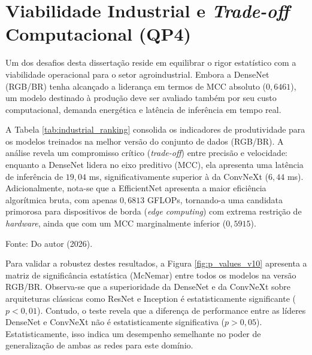 \section{Viabilidade Industrial e \textit{Trade-off} Computacional (QP4)}
\label{sec:viabilidade_industrial}

Um dos desafios desta dissertação reside em equilibrar o rigor estatístico com a viabilidade operacional para o setor agroindustrial. Embora a DenseNet (RGB/BR) tenha alcançado a liderança em termos de MCC absoluto ($0,6461$), um modelo destinado à produção deve ser avaliado também por seu custo computacional, demanda energética e latência de inferência em tempo real.

A Tabela \ref{tab:industrial_ranking} consolida os indicadores de produtividade para os modelos treinados na melhor versão do conjunto de dados (RGB/BR). A análise revela um compromisso crítico (\textit{trade-off}) entre precisão e velocidade: enquanto a DenseNet lidera no eixo preditivo (MCC), ela apresenta uma latência de inferência de $19,04$ ms, significativamente superior à da ConvNeXt ($6,44$ ms). Adicionalmente, nota-se que a EfficientNet apresenta a maior eficiência algorítmica bruta, com apenas $0,6813$ GFLOPs, tornando-a uma candidata primorosa para dispositivos de borda (\textit{edge computing}) com extrema restrição de \textit{hardware}, ainda que com um MCC marginalmente inferior ($0,5915$).

\begin{table}[!h]
    \centering
    \begin{threeparttable}
    \caption{Ranking de Eficiência Industrial (Conjunto de Dados RGB/BR).}
    \label{tab:industrial_ranking}
    
    \begin{tablenotes}
            \small 
            \item[] Fonte: Do autor (2026).
        \end{tablenotes}
        \end{threeparttable}
\end{table}

Para validar a robustez destes resultados, a Figura \ref{fig:p_values_v10} apresenta a matriz de significância estatística (McNemar) entre todos os modelos na versão RGB/BR. Observa-se que a superioridade da DenseNet e da ConvNeXt sobre arquiteturas clássicas como ResNet e Inception é estatisticamente significante ($p < 0,01$). Contudo, o teste revela que a diferença de performance entre as líderes DenseNet e ConvNeXt não é estatisticamente significativa ($p > 0,05$). Estatisticamente, isso indica um desempenho semelhante no poder de generalização de ambas as redes para este domínio.

